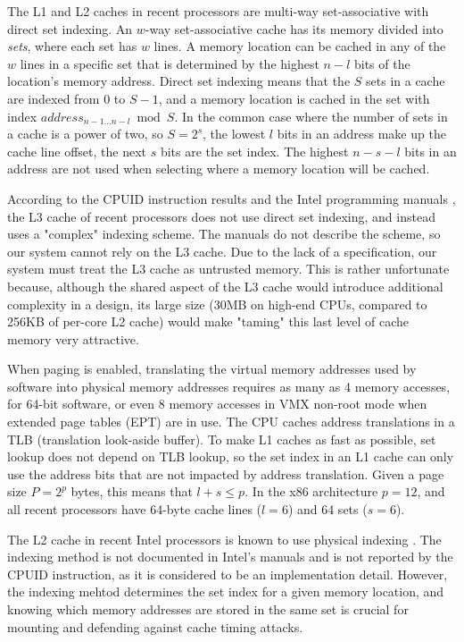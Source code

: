 The L1 and L2 caches in recent processors are multi-way set-associative with
direct set indexing. An $w$-way set-associative cache has its memory divided
into \textit{sets}, where each set has $w$ lines. A memory location can be
cached in any of the $w$ lines in a specific set that is determined by the
highest $n - l$ bits of the location's memory address. Direct set indexing
means that the $S$ sets in a cache are indexed from $0$ to $S - 1$, and a
memory location is cached in the set with index
$address_{n - 1 \ldots n - l} \bmod S$. In the common case where the number of
sets in a cache is a power of two, so $S = 2^{s}$, the lowest $l$ bits in an
address make up the cache line offset, the next $s$ bits are the set index.
The highest $n - s - l$ bits in an address are not used when selecting where a
memory location will be cached.

According to the CPUID instruction results and the Intel programming manuals
\cite{intel2013manual}, the L3 cache of recent processors does not use direct
set indexing, and instead uses a "complex" indexing scheme. The manuals do not
describe the scheme, so our system cannot rely on the L3 cache. Due to the lack
of a specification, our system must treat the L3 cache as untrusted memory.
This is rather unfortunate because, although the shared aspect of the L3 cache
would introduce additional complexity in a design, its large size (30MB on
high-end CPUs, compared to 256KB of per-core L2 cache) would make "taming" this
last level of cache memory very attractive.

When paging is enabled, translating the virtual memory addresses used by
software into physical memory addresses requires as many as 4 memory accesses,
for 64-bit software, or even 8 memory accesses in VMX non-root mode when
extended page tables (EPT) are in use. The CPU caches address translations in a
TLB (translation look-aside buffer). To make L1 caches as fast as possible, set
lookup does not depend on TLB lookup, so the set index in an L1 cache can only
use the address bits that are not impacted by address translation. Given a page
size $P = 2^{p}$ bytes, this means that $l + s \le p$. In the x86 architecture
$p = 12$, and all recent processors have 64-byte cache lines ($l = 6$) and
64 sets ($s = 6$).

The L2 cache in recent Intel processors is known to use physical indexing
\cite{patterson2013architecture}. The indexing method is not documented in
Intel's manuals and is not reported by the CPUID instruction, as it is
considered to be an implementation detail. However, the indexing mehtod
determines the set index for a given memory location, and knowing which memory
addresses are stored in the same set is crucial for mounting and defending
against cache timing attacks.


